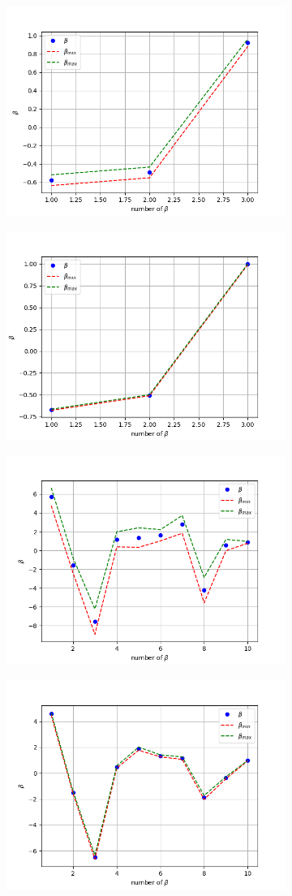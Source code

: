 \begin{figure}[!ht]
\begin{subfigure}{\textwidth}
  \centering
  \includegraphics[width=0.5\linewidth]{images/betas/fake_ridge_beta_p01_n10.png}
\end{subfigure}
\begin{subfigure}{\textwidth}
  \centering
\includegraphics[width=0.5\linewidth]{images/betas/fake_ridge_beta_p01_n100.png}
\end{subfigure}
\begin{subfigure}{\textwidth}
  \centering
\includegraphics[width=0.5\linewidth]{images/betas/fake_ridge_beta_p03_n10.png}
\end{subfigure}
\begin{subfigure}{\textwidth}
  \centering
\includegraphics[width=0.5\linewidth]{images/betas/fake_ridge_beta_p03_n100.png}

\end{subfigure}
\end{figure}
